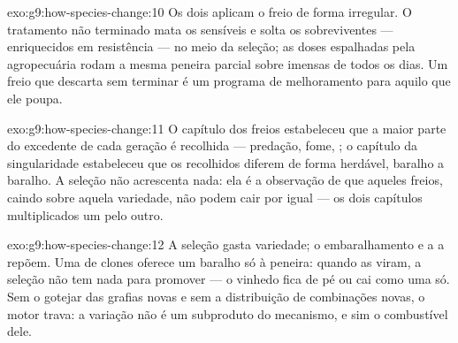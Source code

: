 \begin{solution}{exo:g9:how-species-change:10}
Os dois aplicam o freio de forma irregular. O tratamento não
terminado mata os sensíveis e solta os sobreviventes ---
enriquecidos em resistência --- no meio da seleção; as doses
espalhadas pela agropecuária rodam a mesma peneira parcial
sobre  imensas de  todos os dias. Um freio
que descarta sem terminar é um programa de melhoramento para
aquilo que ele poupa.
\end{solution}

\begin{solution}{exo:g9:how-species-change:11}
O capítulo dos freios estabeleceu que a maior parte do
excedente de cada geração é recolhida --- predação, fome,
; o capítulo da singularidade estabeleceu que os
recolhidos diferem de forma herdável, baralho a baralho. A
seleção não acrescenta nada: ela é a observação de que
aqueles freios, caindo sobre aquela variedade, não podem cair
por igual --- os dois capítulos multiplicados um pelo outro.
\end{solution}

\begin{solution}{exo:g9:how-species-change:12}
A seleção gasta variedade; o embaralhamento e a  a
repõem. Uma  de clones oferece um baralho só à
peneira: quando as  viram, a seleção não tem nada
para promover --- o vinhedo fica de pé ou cai como uma 
só. Sem o gotejar das grafias novas e sem a distribuição de
combinações novas, o motor trava: a variação não é um
subproduto do mecanismo, e sim o combustível dele.
\end{solution}

